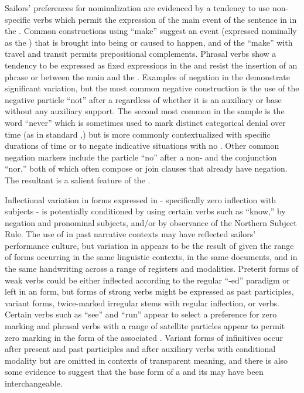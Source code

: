 Sailors’ preferences for nominalization are evidenced by a tendency to use non-specific verbs which permit the expression of the main event of the sentence in  in the . Common constructions using “make” suggest an event (expressed nominally as the ) that is brought into being or caused to happen, and  of the  “make” with travel and transit permits prepositional complements. Phrasal verbs show a tendency to be expressed as fixed expressions in the  and resist the insertion of an  phrase or  between the main  and the . Examples of negation in the  demonstrate significant variation, but the most common negative construction is the use of the negative particle “not” after a  regardless of whether it is an auxiliary or base  without any auxiliary support. The second most common  in the sample is the word “never” which is sometimes used to mark distinct categorical denial over time (as in standard ,) but is more commonly contextualized with specific durations of time or to negate indicative  situations with no . Other common negation markers include the particle “no” after a non- and the conjunction “nor,” both of which often compose or join clauses that already have negation. The resultant  is a salient feature of the . 

Inflectional variation in  forms expressed in  - specifically zero inflection with  subjects - is potentially conditioned by using certain verbs such as “know,” by negation and  pronominal subjects, and/or by observance of the Northern Subject Rule. The use of  in past narrative contexts may have reflected sailors’ performance culture, but variation in  appears to be the result of  given the range of forms occurring in the same linguistic contexts, in the same documents, and in the same handwriting across a range of registers and modalities. Preterit forms of weak verbs could be either inflected according to the regular “-ed” paradigm or left in an  form, but  forms of strong verbs might be expressed as past participles, variant  forms, twice-marked irregular stems with regular inflection, or  verbs. Certain verbs such as “see” and “run” appear to select a preference for zero marking and phrasal verbs with a range of satellite particles appear to permit zero marking in the  form of the associated . Variant forms of infinitives occur after present and past participles and after auxiliary verbs with conditional modality but are omitted in contexts of transparent meaning, and there is also some evidence to suggest that the base form of a  and its  may have been interchangeable.

